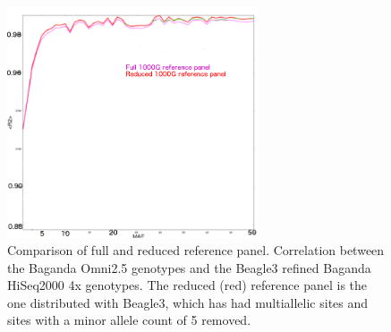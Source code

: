 \begin{figure}
\centering
\includegraphics[width=0.66\textwidth]{fig/imp_accu_beagle}
\caption[Comparison of full and reduced reference panel.]{Comparison of full and reduced reference panel. Correlation between the Baganda Omni2.5 genotypes and the Beagle3 refined Baganda HiSeq2000 4x genotypes. The reduced (red) reference panel is the one distributed with Beagle3, which has had multiallelic sites and sites with a minor allele count of 5 removed.}
\label{fig:imp_accu_beagle}
\end{figure}